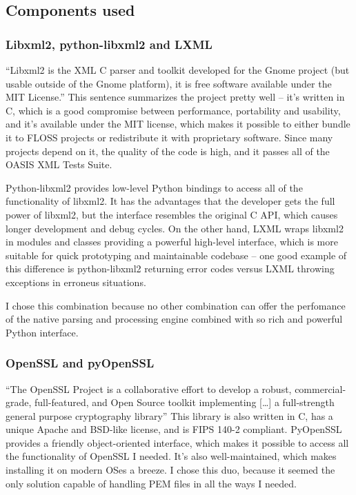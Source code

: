 \subsection{Components used}

\subsubsection{Libxml2, python-libxml2 and LXML}

``Libxml2 is the XML C parser and toolkit developed for the Gnome project (but usable outside of the Gnome platform), it is free software available under the MIT License.''\cite{libxml2-homepage} This sentence summarizes the project pretty well -- it's written in C, which is a good compromise between performance, portability and usability, and it's available under the MIT license, which makes it possible to either bundle it to FLOSS projects or redistribute it with proprietary software. Since many projects depend on it, the quality of the code is high, and it passes all of the OASIS XML Tests Suite.

Python-libxml2 provides low-level Python bindings to access all of the functionality of libxml2. It has the advantages that the developer gets the full power of libxml2, but the interface resembles the original C API, which causes longer development and debug cycles. On the other hand, LXML wraps libxml2 in modules and classes providing a powerful high-level interface, which is more suitable for quick prototyping and maintainable codebase -- one good example of this difference is python-libxml2 returning error codes versus LXML throwing exceptions in erroneus situations.

I chose this combination because no other combination can offer the perfomance of the native parsing and processing engine combined with so rich and powerful Python interface.

\subsubsection{OpenSSL and pyOpenSSL}

``The OpenSSL Project is a collaborative effort to develop a robust, commercial-grade, full-featured, and Open Source toolkit implementing [\ldots] a full-strength general purpose cryptography library''\cite{openssl-homepage} This library is also written in C, has a unique Apache and BSD-like license, and is FIPS 140-2 compliant. PyOpenSSL provides a friendly object-oriented interface, which makes it possible to access all the functionality of OpenSSL I needed. It's also well-maintained, which makes installing it on modern OSes a breeze. I chose this duo, because it seemed the only solution capable of handling PEM files in all the ways I needed.


